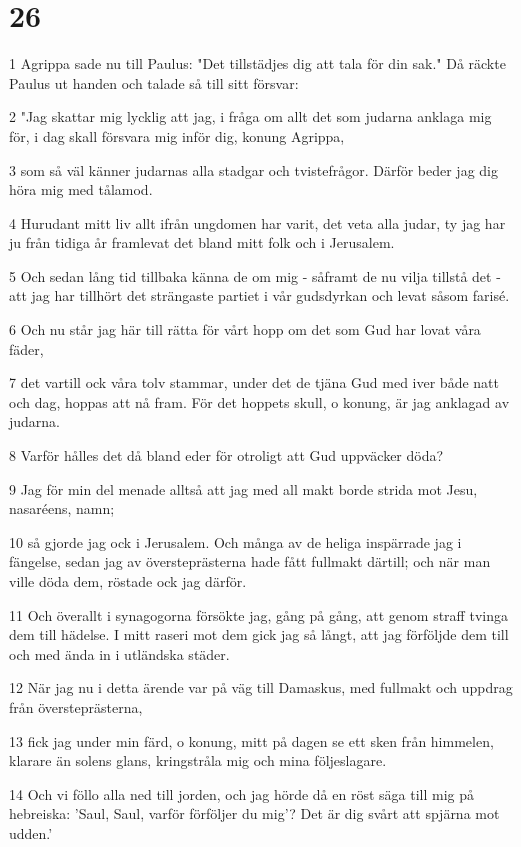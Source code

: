 \chapter{26}

\par 1 Agrippa sade nu till Paulus: "Det tillstädjes dig att tala för din sak." Då räckte Paulus ut handen och talade så till sitt försvar:
\par 2 "Jag skattar mig lycklig att jag, i fråga om allt det som judarna anklaga mig för, i dag skall försvara mig inför dig, konung Agrippa,
\par 3 som så väl känner judarnas alla stadgar och tvistefrågor. Därför beder jag dig höra mig med tålamod.
\par 4 Hurudant mitt liv allt ifrån ungdomen har varit, det veta alla judar, ty jag har ju från tidiga år framlevat det bland mitt folk och i Jerusalem.
\par 5 Och sedan lång tid tillbaka känna de om mig - såframt de nu vilja tillstå det - att jag har tillhört det strängaste partiet i vår gudsdyrkan och levat såsom farisé.
\par 6 Och nu står jag här till rätta för vårt hopp om det som Gud har lovat våra fäder,
\par 7 det vartill ock våra tolv stammar, under det de tjäna Gud med iver både natt och dag, hoppas att nå fram. För det hoppets skull, o konung, är jag anklagad av judarna.
\par 8 Varför hålles det då bland eder för otroligt att Gud uppväcker döda?
\par 9 Jag för min del menade alltså att jag med all makt borde strida mot Jesu, nasaréens, namn;
\par 10 så gjorde jag ock i Jerusalem. Och många av de heliga inspärrade jag i fängelse, sedan jag av översteprästerna hade fått fullmakt därtill; och när man ville döda dem, röstade ock jag därför.
\par 11 Och överallt i synagogorna försökte jag, gång på gång, att genom straff tvinga dem till hädelse. I mitt raseri mot dem gick jag så långt, att jag förföljde dem till och med ända in i utländska städer.
\par 12 När jag nu i detta ärende var på väg till Damaskus, med fullmakt och uppdrag från översteprästerna,
\par 13 fick jag under min färd, o konung, mitt på dagen se ett sken från himmelen, klarare än solens glans, kringstråla mig och mina följeslagare.
\par 14 Och vi föllo alla ned till jorden, och jag hörde då en röst säga till mig på hebreiska: 'Saul, Saul, varför förföljer du mig'? Det är dig svårt att spjärna mot udden.'
